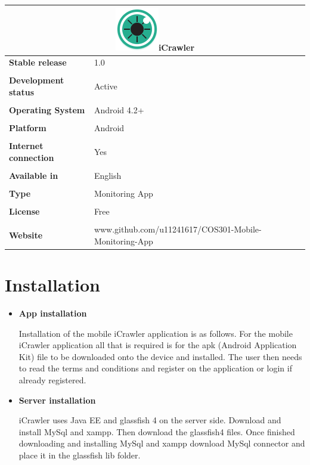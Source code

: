 \documentclass[hidelinks, 12pt, oneside]{article}
\begin{document}
	\begin{tabular}{ |l|l| }  \multicolumn{2}{|c|}{\includegraphics[width=0.1 \textwidth]{img/icon.png}iCrawler}
	 \\ \hline\noalign{\smallskip} \textbf{Stable release} & 1.0
	  \\\\ \noalign{\smallskip} \textbf{Development status}& Active
	  \\\\ \noalign{\smallskip}\textbf{Operating System}& Android 4.2+
	  \\\\ \noalign{\smallskip}\textbf{Platform}& Android
	  \\\\ \noalign{\smallskip}\textbf{Internet connection} & Yes
	  \\\\ \noalign{\smallskip}\textbf{Available in} & English
	  \\\\ \noalign{\smallskip}\textbf{Type}& Monitoring App
	  \\\\ \noalign{\smallskip}\textbf{License}& Free
	  \\\\ \noalign{\smallskip}\textbf{Website}& www.github.com/u11241617/COS301-Mobile-Monitoring-App
	 \end{tabular}\newpage
	\section{Installation}
\begin{itemize}
  \item\textbf{App installation}
  
	Installation of the mobile iCrawler application is as follows. For the mobile iCrawler application all that is required is for the apk (Android 			Application Kit) file to be downloaded onto the device and installed. The user then needs to read the terms and conditions and register on the 				application or login if already registered.
\end{itemize}	

\begin{itemize}
  \item\textbf{Server installation}
  
 iCrawler uses Java EE and glassfish 4 on the server side. Download and install MySql and xampp. Then download the glassfish4 files. Once finished downloading and installing MySql and xampp download MySql connector and place it in the glassfish lib folder.
\end{itemize}	
	
\end{document}
